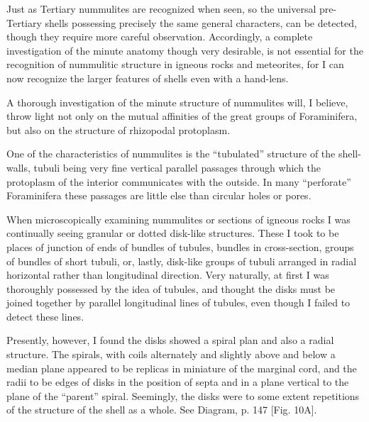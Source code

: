 \documentclass[a4paper, 12pt, oneside]{article}
\begin{document}
Just as Tertiary nummulites are recognized when seen, so the universal pre-Tertiary shells possessing precisely the same general characters, can be detected, though they require more careful observation. Accordingly, a complete investigation of the minute anatomy though very desirable, is not essential for the recognition of nummulitic structure in igneous rocks and meteorites, for I can now recognize the larger features of shells even with a hand-lens.

A thorough investigation of the minute structure of nummulites will, I believe, throw light not only on the mutual affinities of the great groups of Foraminifera, but also on the structure of rhizopodal protoplasm.

One of the characteristics of nummulites is the ``tubulated'' structure of the shell-walls, tubuli being very fine vertical parallel passages through which the protoplasm of the interior communicates with the outside. In many ``perforate'' Foraminifera these passages are little else than circular holes or pores.

When microscopically examining nummulites or sections of igneous rocks I was continually seeing granular or dotted disk-like structures. These I took to be places of junction of ends of bundles of tubules, bundles in cross-section, groups of bundles of short tubuli, or, lastly, disk-like groups of tubuli arranged in radial horizontal rather than longitudinal direction. Very naturally, at first I was thoroughly possessed by the idea of tubules, and thought the disks must be joined together by parallel longitudinal lines of tubules, even though I failed to detect these lines.

Presently, however, I found the disks showed a spiral plan and also a radial structure. The spirals, with coils alternately and slightly above and below a median plane appeared to be replicas in miniature of the marginal cord, and the radii to be edges of disks in the position of septa and in a plane vertical to the plane of the ``parent'' spiral. Seemingly, the disks were to some extent repetitions of the structure of the shell as a whole. See Diagram, p. 147 [Fig. 10A].
\end{document}
